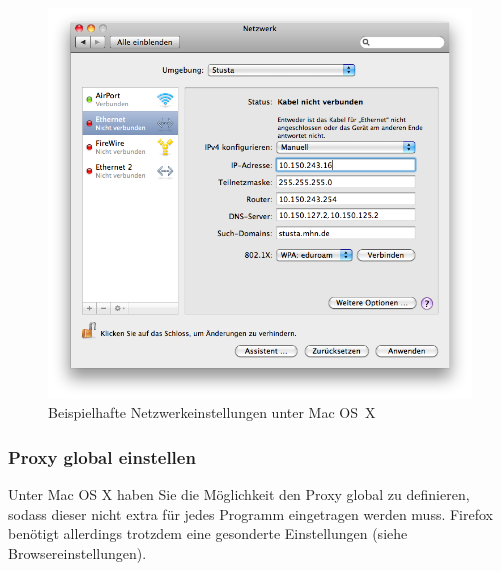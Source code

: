 \documentclass[a4paper,12pt]{scrartcl}
\begin{document}
\begin{enumerate}
\begin{figure}[h!]
\begin{minipage}[c]{0.38\linewidth}
        \end{minipage}
        \begin{minipage}[c]{0.60\linewidth}
          \centering
          \includegraphics[width=0.9\linewidth,keepaspectratio]{Bilder/IP_MAC_mb}
          \caption{Beispielhafte Netzwerkeinstellungen unter Mac OS~X}
        \end{minipage}
      \vspace{-20pt}
      \end{figure}
\end{enumerate}
\vspace{-15pt}
\subsubsection*{Proxy global einstellen}
Unter Mac OS X haben Sie die Möglichkeit den Proxy global zu definieren, sodass dieser nicht extra für jedes Programm eingetragen werden muss. Firefox benötigt allerdings trotzdem eine gesonderte Einstellungen (siehe Browsereinstellungen). %
\end{document}
